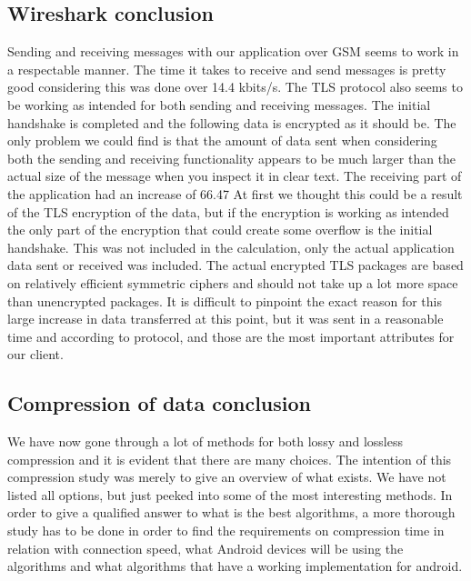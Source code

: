 \newpage

\subsection{Wireshark conclusion}
Sending and receiving messages with our application over GSM seems to work in a respectable manner. The time it takes to receive and send messages is pretty good considering this was done over 14.4 kbits/s. The TLS protocol also seems to be working as intended for both sending and receiving messages. The initial handshake is completed and the following data is encrypted as it should be. 
\newline
\newline
The only problem we could find is that the amount of data sent when considering both the sending and receiving functionality appears to be much larger than the actual size of the message when you inspect it in clear text. The receiving part of the application had an increase of 66.47%
\newline
\newline
At first we thought this could be a result of the TLS encryption of the data, but if the encryption is working as intended the only part of the encryption that could create some overflow is the initial handshake. This was not included in the calculation, only the actual application data sent or received was included. The actual encrypted TLS packages are based on relatively efficient symmetric ciphers and should not take up a lot more space than unencrypted packages.  
\newline
\newline
It is difficult to pinpoint the exact reason for this large increase in data transferred at this point, but it was sent in a reasonable time and according to protocol, and those are the most important attributes for our client.  

\subsection{Compression of data conclusion}
We have now gone through a lot of methods for both lossy and lossless compression and it is evident that there are many choices. The intention of this compression study was merely to give an overview of what exists. We have not listed all options, but just peeked into some of the most interesting methods. In order to give a qualified answer to what is the best algorithms, a more thorough study has to be done in order to find the requirements on compression time in relation with connection speed, what Android devices will be using the algorithms and what algorithms that have a working implementation for android.  